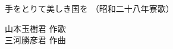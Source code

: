 \documentclass[10pt,b5j]{tarticle} %
\begin{document}
\begin{minipage}[c]{0.7\hsize} %
    \begin{center}
        {\LARGE
            手をとりて美しき国を %
        }
        {\small 
            （昭和二十八年寮歌） %
        }
    \end{center}
\end{minipage}
\begin{minipage}[c]{0.3\hsize} %
    \begin{flushright} %
        山本玉樹君 作歌\\三河勝彦君 作曲 %
    \end{flushright}
\end{minipage}
\end{document}
